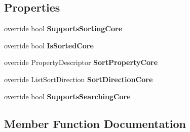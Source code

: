 \subsection*{Properties}
\begin{DoxyCompactItemize}
\item 
override bool {\bfseries Supports\+Sorting\+Core}\hypertarget{class_products_1_1_common_1_1_sortable_binding_list_a282f7c7f5ce743b3fb08d935fe93cd3f}{}\label{class_products_1_1_common_1_1_sortable_binding_list_a282f7c7f5ce743b3fb08d935fe93cd3f}

\item 
override bool {\bfseries Is\+Sorted\+Core}\hypertarget{class_products_1_1_common_1_1_sortable_binding_list_a5b13bd0a68b9e5089232c00a704ec059}{}\label{class_products_1_1_common_1_1_sortable_binding_list_a5b13bd0a68b9e5089232c00a704ec059}

\item 
override Property\+Descriptor {\bfseries Sort\+Property\+Core}\hypertarget{class_products_1_1_common_1_1_sortable_binding_list_a88a569cf71589a099ad6b05b4f9e444b}{}\label{class_products_1_1_common_1_1_sortable_binding_list_a88a569cf71589a099ad6b05b4f9e444b}

\item 
override List\+Sort\+Direction {\bfseries Sort\+Direction\+Core}\hypertarget{class_products_1_1_common_1_1_sortable_binding_list_a461b48d8263278d9b9d06d027644d20d}{}\label{class_products_1_1_common_1_1_sortable_binding_list_a461b48d8263278d9b9d06d027644d20d}

\item 
override bool {\bfseries Supports\+Searching\+Core}\hypertarget{class_products_1_1_common_1_1_sortable_binding_list_aa9d7472b3158fcfcbb41ac6eaacdec2f}{}\label{class_products_1_1_common_1_1_sortable_binding_list_aa9d7472b3158fcfcbb41ac6eaacdec2f}

\end{DoxyCompactItemize}


\subsection{Member Function Documentation}
